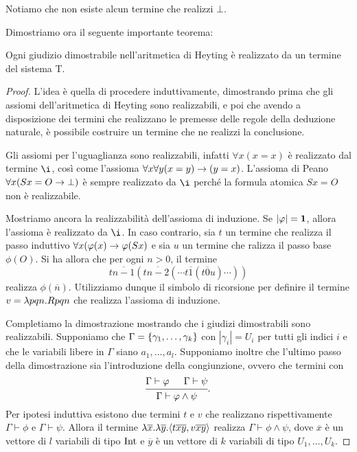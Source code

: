 \documentclass[]{marticle}
\begin{document}
Notiamo che non esiste alcun termine che realizzi $\bot$.

Dimostriamo ora il seguente importante teorema:
\begin{block}[Teorema]
    Ogni giudizio dimostrabile nell'aritmetica di Heyting \`e realizzato da un
    termine del sistema T.
\end{block}
\begin{proof}
    L'idea \`e quella di procedere induttivamente, dimostrando prima che gli
    assiomi dell'aritmetica di Heyting sono realizzabili, e poi che avendo a
    disposizione dei termini che realizzano le premesse delle regole della
    deduzione naturale, \`e possibile costruire un termine che ne realizzi la
    conclusione.

    Gli assiomi per l'uguaglianza sono realizzabili, infatti $\forall x(x=x)$
    \`e realizzato dal termine $\i$, cos\`i come l'assioma $\forall x\forall y
    (x=y)\rightarrow(y=x)$. 
    L'assioma di Peano $\forall x (Sx=O\rightarrow \bot)$ \`e sempre realizzato da $\i$
    perch\'e la formula atomica $Sx=O$ non \`e realizzabile.

    Mostriamo ancora la realizzabilit\`a dell'assioma di induzione. Se
    $|\varphi|=\text{\textbf{1}}$, allora l'assioma \`e realizzato da $\i$. In caso contrario,
    sia $t$ un termine che realizza il passo induttivo $\forall x(\varphi(x) \rightarrow
    \varphi(Sx)$ e sia $u$ un termine che ralizza il passo base $\phi(O)$. Si ha
    allora che per ogni $n>0$, il termine
    \[
        t\overline{n-1}(t \overline{n-2}(\cdots t \overline{1}( t \overline{0} u
        )\cdots))
    \]
    realizza $\phi(\overline{n})$. Utilizziamo dunque il simbolo di ricorsione
    per definire il termine $v = \lambda pqn. Rpqn$ che realizza l'assioma di
    induzione.

    Completiamo la dimostrazione mostrando che i giudizi dimostrabili sono
    realizzabili. Supponiamo che $\Gamma = \{\gamma_1, \dots , \gamma_k\}$
    con $|\gamma_i| = U_i$ per tutti gli indici $i$ e che le variabili libere in
    $\Gamma$ siano $a_1, \dots, a_l$. Supponiamo inoltre che l'ultimo passo
    della dimostrazione sia l'introduzione della congiunzione, ovvero che
    termini con
    \[
        \begin{prooftree}
            \hypo{\Gamma\vdash \phi}
            \hypo{\Gamma\vdash \psi}
            \infer2{\Gamma\vdash \phi\land\psi}
        \end{prooftree}.
    \]
    Per ipotesi induttiva esistono due termini $t$ e $v$ che realizzano
    rispettivamente $\Gamma \vdash\phi$ e $\Gamma \vdash\psi$. Allora il termine
    $\lambda \overline{x}. \lambda \overline{y}. \langle t\overline{x} \overline{y},v
    \overline{x} \overline{y} \rangle$ realizza $\Gamma \vdash \phi \land \psi$, dove
    $\overline{x}$ \`e un vettore di $l$ variabili di tipo $\text{Int}$ e
    $\overline{y}$ \`e un vettore di $k$ variabili di tipo $U_1, \dots, U_k$.


\end{proof}
\end{document}
